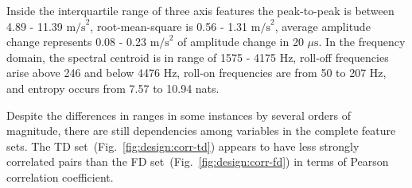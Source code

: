 Inside the interquartile range of three axis features the peak-to-peak is between 4.89 - 11.39 $\mathrm{m/s}^2$, root-mean-square is 0.56 - 1.31 $\mathrm{m/s}^2$, average amplitude change represents 0.08 - 0.23 $\mathrm{m/s}^2$ of amplitude change in 20 $\mu\mathrm{s}$. In the frequency domain, the spectral centroid is in range of 1575 - 4175 Hz, roll-off frequencies arise above 246 and below 4476 Hz, roll-on frequencies are from 50 to 207 Hz, and entropy occurs from 7.57 to 10.94 nats.

Despite the differences in ranges in some instances by several orders of magnitude, there are still dependencies among variables in the complete feature sets. The TD set~(Fig.~\ref{fig:design:corr-td}) appears to have less strongly correlated pairs than the FD set~(Fig.~\ref{fig:design:corr-fd}) in terms of Pearson correlation coefficient. 

